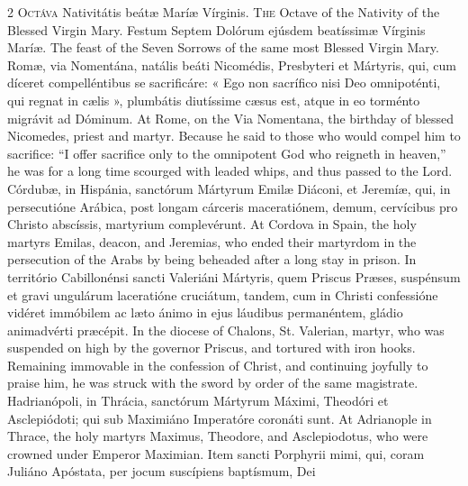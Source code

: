 \begin{paracol}{2}
\lettrine[lines=2]{O}{ctáva} Nativitátis 
 beátæ Maríæ Vírginis.
\switchcolumn
{}
\lettrine[lines=2]{T}{he} Octave of the Nativity of the 
 Blessed Virgin Mary.
\switchcolumn*
{}
Festum Septem Dolórum 
 ejúsdem beatíssimæ Vírginis Maríæ.
\switchcolumn
{}
The feast of the Seven Sorrows of 
 the same most Blessed Virgin Mary.
\switchcolumn*
{}
Romæ, via Nomentána, 
 natális beáti Nicomédis, Presbyteri et Mártyris, qui, cum díceret 
 compelléntibus se sacrificáre: « Ego non sacrífico nisi Deo omnipoténti, qui 
 regnat in cælis », plumbátis diutíssime cæsus est, atque in eo torménto 
 migrávit ad Dóminum.
\switchcolumn
{}
At Rome, on the Via Nomentana, the 
 birthday of blessed Nicomedes, priest and martyr. Because he said to 
 those who would compel him to sacrifice: ``I offer sacrifice only to the 
 omnipotent God who reigneth in heaven,'' he was for a long time scourged with 
 leaded whips, and thus passed to the Lord.
\switchcolumn*
{}
Córdubæ, in Hispánia, 
 sanctórum Mártyrum Emilæ Diáconi, et Jeremíæ, qui, in persecutióne Arábica, 
 post longam cárceris maceratiónem, demum, cervícibus pro Christo abscíssis, 
 martyrium complevérunt.
\switchcolumn
{}
At Cordova in Spain, the holy 
 martyrs Emilas, deacon, and Jeremias, who ended their martyrdom in the 
 persecution of the Arabs by being beheaded after a long stay in prison.
\switchcolumn*
{}
In território 
 Cabillonénsi sancti Valeriáni Mártyris, quem Priscus Præses, suspénsum et 
 gravi ungulárum laceratióne cruciátum, tandem, cum in Christi confessióne 
 vidéret immóbilem ac læto ánimo in ejus láudibus permanéntem, gládio 
 animadvérti præcépit.
\switchcolumn
{}
In the diocese of Chalons, St. 
 Valerian, martyr, who was suspended on high by the governor Priscus, and 
 tortured with iron hooks. Remaining immovable in the confession of 
 Christ, and continuing joyfully to praise him, he was struck with the sword 
 by order of the same magistrate.
\switchcolumn*
{}
Hadrianópoli, in 
 Thrácia, sanctórum Mártyrum Máximi, Theodóri et Asclepiódoti; qui sub 
 Maximiáno Imperatóre coronáti sunt.
\switchcolumn
{}
At Adrianople in Thrace, the holy martyrs 
 Maximus, Theodore, and Asclepiodotus, who were crowned under Emperor 
 Maximian.
\switchcolumn*
{}
Item sancti Porphyrii 
 mimi, qui, coram Juliáno Apóstata, per jocum suscípiens baptísmum, Dei 

\end{paracol}
